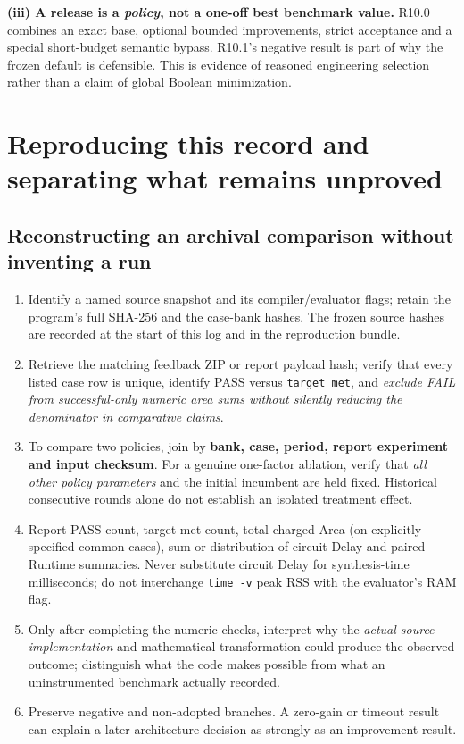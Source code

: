 \textbf{(iii) A release is a \emph{policy}, not a one-off best benchmark value.} R10.0 combines an exact base, optional bounded improvements, strict acceptance and a special short-budget semantic bypass. R10.1's negative result is part of why the frozen default is defensible. This is evidence of reasoned engineering selection rather than a claim of global Boolean minimization.

\section{Reproducing this record and separating what remains unproved}\label{reproducing-this-record-and-separating-what-remains-unproved}

\subsection{Reconstructing an archival comparison without inventing a run}\label{reconstructing-an-archival-comparison-without-inventing-a-run}

\begin{enumerate}
\def\labelenumi{\arabic{enumi}.}
\tightlist
\item
  Identify a named source snapshot and its compiler/evaluator flags; retain the program's full SHA-256 and the case-bank hashes. The frozen source hashes are recorded at the start of this log and in the reproduction bundle.
\item
  Retrieve the matching feedback ZIP or report payload hash; verify that every listed case row is unique, identify PASS versus \texttt{target\_met}, and \emph{exclude FAIL from successful-only numeric area sums without silently reducing the denominator in comparative claims}.
\item
  To compare two policies, join by \textbf{bank, case, period, report experiment and input checksum}. For a genuine one-factor ablation, verify that \emph{all other policy parameters} and the initial incumbent are held fixed. Historical consecutive rounds alone do not establish an isolated treatment effect.
\item
  Report PASS count, target-met count, total charged Area (on explicitly specified common cases), sum or distribution of circuit Delay and paired Runtime summaries. Never substitute circuit Delay for synthesis-time milliseconds; do not interchange \texttt{time\ -v} peak RSS with the evaluator's RAM flag.
\item
  Only after completing the numeric checks, interpret why the \emph{actual source implementation} and mathematical transformation could produce the observed outcome; distinguish what the code makes possible from what an uninstrumented benchmark actually recorded.
\item
  Preserve negative and non-adopted branches. A zero-gain or timeout result can explain a later architecture decision as strongly as an improvement result.
\end{enumerate}

